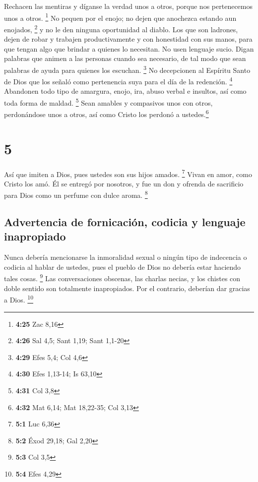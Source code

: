  Rechacen las mentiras y díganse la verdad unos a otros,
porque nos pertenecemos unos a otros. \footnote{\textbf{4:25} Zac 8,16}
 No pequen por el enojo; no dejen que anochezca estando
aun enojados, \footnote{\textbf{4:26} Sal 4,5; Sant 1,19; Sant 1,1-20}
 y no le den ninguna oportunidad al diablo.
 Los que son ladrones, dejen de robar y trabajen
productivamente y con honestidad con sus manos, para que tengan algo que
brindar a quienes lo necesitan.  No usen lenguaje sucio.
Digan palabras que animen a las personas cuando sea necesario, de tal
modo que sean palabras de ayuda para quienes los escuchan. \footnote{\textbf{4:29}
  Efes 5,4; Col 4,6}  No decepcionen al Espíritu Santo de
Dios que los señaló como pertenencia suya para el día de la redención.
\footnote{\textbf{4:30} Efes 1,13-14; Is 63,10} 
Abandonen todo tipo de amargura, enojo, ira, abuso verbal e insultos,
así como toda forma de maldad. \footnote{\textbf{4:31} Col 3,8}
 Sean amables y compasivos unos con otros, perdonándose
unos a otros, así como Cristo los perdonó a ustedes.\footnote{\textbf{4:32}
  Mat 6,14; Mat 18,22-35; Col 3,13}

\hypertarget{section-4}{%
\section{5}\label{section-4}}

 Así que imiten a Dios, pues ustedes son sus hijos amados.
\footnote{\textbf{5:1} Luc 6,36}  Vivan en amor, como
Cristo los amó. Él se entregó por nosotros, y fue un don y ofrenda de
sacrificio para Dios como un perfume con dulce aroma. \footnote{\textbf{5:2}
  Éxod 29,18; Gal 2,20}

\hypertarget{advertencia-de-fornicaciuxf3n-codicia-y-lenguaje-inapropiado}{%
\subsection{Advertencia de fornicación, codicia y lenguaje
inapropiado}\label{advertencia-de-fornicaciuxf3n-codicia-y-lenguaje-inapropiado}}

 Nunca debería mencionarse la inmoralidad sexual o ningún
tipo de indecencia o codicia al hablar de ustedes, pues el pueblo de
Dios no debería estar haciendo tales cosas. \footnote{\textbf{5:3} Col
  3,5}  Las conversaciones obscenas, las charlas necias, y
los chistes con doble sentido son totalmente inapropiados. Por el
contrario, deberían dar gracias a Dios. \footnote{\textbf{5:4} Efes 4,29}

